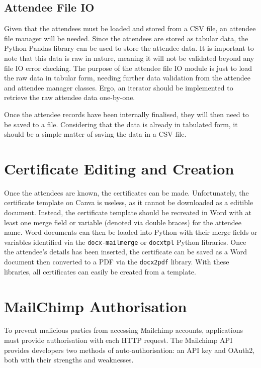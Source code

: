 \documentclass[11pt]{article}
\begin{document}
\subsection{Attendee File IO}

Given that the attendees must be loaded and stored from a CSV file, an attendee file manager will be needed. Since the attendees are stored as tabular data, the Python Pandas library can be used to store the attendee data. It is important to note that this data is raw in nature, meaning it will not be validated beyond any file IO error checking. The purpose of the attendee file IO module is just to load the raw data in tabular form, needing further data validation from the attendee and attendee manager classes. Ergo, an iterator should be implemented to retrieve the raw attendee data one-by-one.

Once the attendee records have been internally finalised, they will then need to be saved to a file. Considering that the data is already in tabulated form, it should be a simple matter of saving the data in a CSV file.

\newpage

\section{Certificate Editing and Creation}

Once the attendees are known, the certificates can be made. Unfortunately, the certificate template on Canva is useless, as it cannot be downloaded as a editible document. Instead, the certificate template should be recreated in Word with at least one merge field or variable (denoted via double braces) for the attendee name. Word documents can then be loaded into Python with their merge fields or variables identified via the \texttt{docx-mailmerge} or \texttt{docxtpl} Python libraries. Once the attendee's details has been inserted, the certificate can be saved as a Word document then converted to a PDF via the \texttt{docx2pdf} library. With these libraries, all certificates can easily be created from a template.

\newpage

\section{MailChimp Authorisation}

To prevent malicious parties from accessing Mailchimp accounts, applications must provide authorisation with each HTTP request. The Mailchimp API provides developers two methods of auto-authorisation: an API key and OAuth2, both with their strengths and weaknesses.
\end{document}
